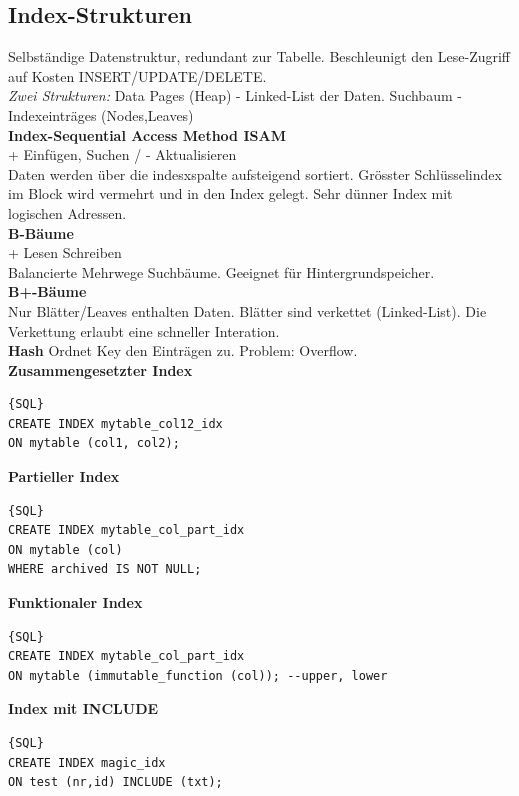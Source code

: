 \documentclass[7pt,landscape,a4paper]{scrartcl}
\begin{document}
\begin{multicols*}{4}
\subsection{Index-Strukturen}
Selbständige Datenstruktur, redundant zur Tabelle. Beschleunigt den Lese-Zugriff auf Kosten INSERT/UPDATE/DELETE.\\
\textit{Zwei Strukturen:} Data Pages (Heap) - Linked-List der Daten.
Suchbaum - Indexeinträges (Nodes,Leaves)
\\
\textbf{Index-Sequential Access Method ISAM}\\
+ Einfügen, Suchen / - Aktualisieren\\
Daten werden über die indesxspalte aufsteigend sortiert. Grösster Schlüsselindex im Block wird vermehrt und in den Index gelegt. Sehr dünner Index mit logischen Adressen.\\
\textbf{B-Bäume}\\
+ Lesen Schreiben\\
Balancierte Mehrwege Suchbäume. Geeignet für Hintergrundspeicher. \\
\textbf{B+-Bäume}\\
Nur Blätter/Leaves enthalten Daten. Blätter sind verkettet (Linked-List). Die Verkettung erlaubt eine schneller Interation. \\
\textbf{Hash} 
Ordnet Key den Einträgen zu.
Problem: Overflow.\\
\textbf{Zusammengesetzter Index}
\begin{lstlisting}{SQL}
CREATE INDEX mytable_col12_idx
ON mytable (col1, col2);
\end{lstlisting}
\textbf{Partieller Index}
\begin{lstlisting}{SQL}
CREATE INDEX mytable_col_part_idx
ON mytable (col)
WHERE archived IS NOT NULL;
\end{lstlisting}
\textbf{Funktionaler Index}
\begin{lstlisting}{SQL}
CREATE INDEX mytable_col_part_idx
ON mytable (immutable_function (col)); --upper, lower
\end{lstlisting}
\textbf{Index mit INCLUDE}
\begin{lstlisting}{SQL}
CREATE INDEX magic_idx
ON test (nr,id) INCLUDE (txt);
\end{lstlisting}

\end{multicols*}
\end{document}
